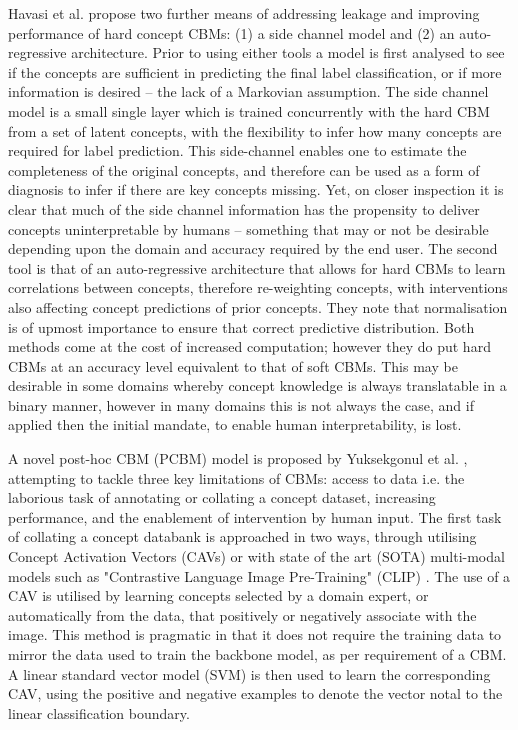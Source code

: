 Havasi et al. \cite{havasiAddressingLeakageConcept2022a} propose two further means of addressing leakage and improving performance of hard concept CBMs: (1) a side channel model and (2) an auto-regressive architecture. Prior to using either tools a model is first analysed to see if the concepts are sufficient in predicting the final label classification, or if more information is desired – the lack of a Markovian assumption. The side channel model is a small single layer which is trained concurrently with the hard CBM from a set of latent concepts, with the flexibility to infer how many concepts are required for label prediction. This side-channel enables one to estimate the completeness of the original concepts, and therefore can be used as a form of diagnosis to infer if there are key concepts missing. Yet, on closer inspection it is clear that much of the side channel information has the propensity to deliver concepts uninterpretable by humans – something that may or not be desirable depending upon the domain and accuracy required by the end user. The second tool is that of an auto-regressive architecture that allows for hard CBMs to learn correlations between concepts, therefore re-weighting concepts, with interventions also affecting concept predictions of prior concepts. They note that normalisation is of upmost importance to ensure that correct predictive distribution. Both methods come at the cost of increased  computation; however they do put hard CBMs at an accuracy level equivalent to that of soft CBMs. This may be desirable in some domains whereby concept knowledge is always translatable in a binary manner, however in many domains this is not always the case, and if applied then the initial mandate, to enable human interpretability, is lost.

A novel post-hoc CBM (PCBM) model is proposed by Yuksekgonul et al. \cite{yuksekgonulPosthocConceptBottleneck2022}, attempting to tackle three key limitations of CBMs: access to data i.e. the laborious task of annotating or collating a concept dataset, increasing performance, and the enablement of intervention by human input. The first task of collating a concept databank is approached in two ways, through utilising Concept Activation Vectors (CAVs) or with state of the art (SOTA) multi-modal models such as "Contrastive Language Image Pre-Training" (CLIP) \cite{radfordLearningTransferableVisual2021}. 
The use of a CAV is utilised by learning concepts selected by a domain expert, or automatically from the data, that positively or negatively associate with the image. This method is pragmatic in that it does not require the training data to mirror the data used to train the backbone model, as per requirement of a CBM. A linear standard vector model (SVM) is then used to learn the corresponding CAV, using the positive and negative examples to denote the vector notal to the linear classification boundary.

